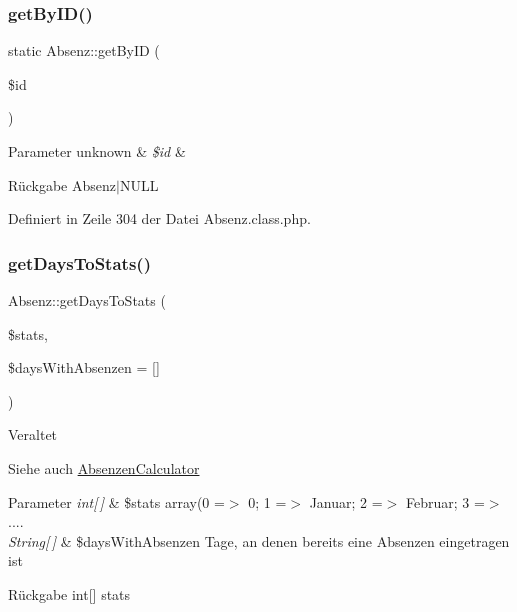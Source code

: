 \subsubsection{\texorpdfstring{get\+By\+I\+D()}{getByID()}}
{\footnotesize\ttfamily static Absenz\+::get\+By\+ID (\begin{DoxyParamCaption}\item[{}]{\$id }\end{DoxyParamCaption})\hspace{0.3cm}{\ttfamily [static]}}


\begin{DoxyParams}[1]{Parameter}
unknown & {\em \$id} & \\
\hline
\end{DoxyParams}
\begin{DoxyReturn}{Rückgabe}
Absenz$\vert$\+N\+U\+LL 
\end{DoxyReturn}


Definiert in Zeile 304 der Datei Absenz.\+class.\+php.

\mbox{\label{class_absenz_add0f9bd99894d733db7777290a3ade7a}} 
\subsubsection{\texorpdfstring{get\+Days\+To\+Stats()}{getDaysToStats()}}
{\footnotesize\ttfamily Absenz\+::get\+Days\+To\+Stats (\begin{DoxyParamCaption}\item[{}]{\$stats,  }\item[{}]{\$days\+With\+Absenzen = {\ttfamily \mbox{[}\mbox{]}} }\end{DoxyParamCaption})}

\begin{DoxyRefDesc}{Veraltet}
\item[\mbox{\hyperlink{deprecated__deprecated000011}{Veraltet}}]\end{DoxyRefDesc}
\begin{DoxySeeAlso}{Siehe auch}
\mbox{\hyperlink{class_absenzen_calculator}{Absenzen\+Calculator}} 
\end{DoxySeeAlso}

\begin{DoxyParams}{Parameter}
{\em int\mbox{[}$\,$\mbox{]}} & \$stats array(0 =$>$ 0; 1 =$>$ Januar; 2 =$>$ Februar; 3 =$>$ .... \\
\hline
{\em String\mbox{[}$\,$\mbox{]}} & \$days\+With\+Absenzen Tage, an denen bereits eine Absenzen eingetragen ist \\
\hline
\end{DoxyParams}
\begin{DoxyReturn}{Rückgabe}
int\mbox{[}\mbox{]} stats 
\end{DoxyReturn}


